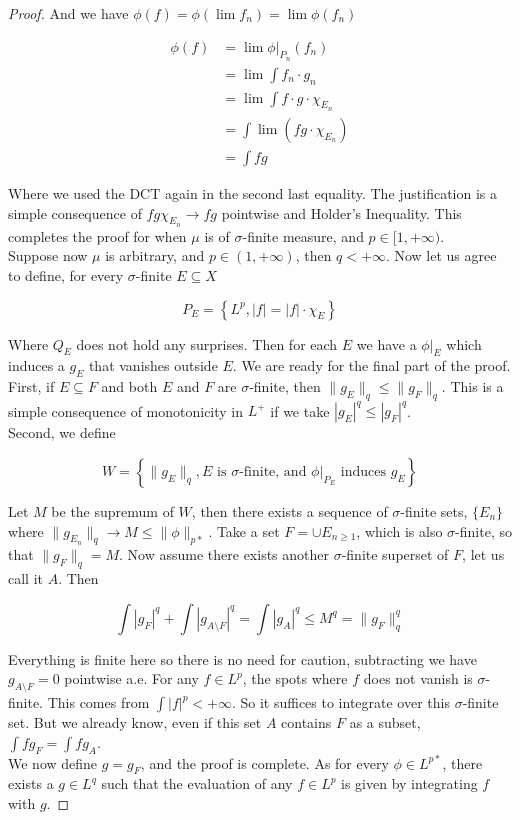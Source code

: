 \documentclass[../../main.tex]{subfiles}
\begin{document}
\begin{proof}
And we have $\phi(f) = \phi(\lim f_n) = \lim\phi(f_n)$

\begin{align*}
    \phi(f) &= \lim \phi|_{P_n}(f_n)\\
    &= \lim \int f_n\cdot g_n\\
    &= \lim \int f\cdot g\cdot\chi_{E_n}\\
    &= \int \lim\left(fg\cdot\chi_{E_n}\right)\\
    &= \int fg
\end{align*}

Where we used the DCT again in the second last equality. The justification is a simple consequence of $fg\chi_{E_n}\to fg$ pointwise and Holder's Inequality. This completes the proof for when $\mu$ is of $\sigma$-finite measure, and $p\in[1,+\infty)$.\\

Suppose now $\mu$ is arbitrary, and $p\in(1,+\infty)$, then $q<+\infty$. Now let us agree to define, for every $\sigma$-finite $E\subseteq X$

\[
P_E = \left\{L^p, |f| = |f|\cdot\chi_E\right\}
\]

Where $Q_E$ does not hold any surprises. Then for each $E$ we have a $\phi|_E$ which induces a $g_E$ that vanishes outside $E$. We are ready for the final part of the proof.\\

First, if $E\subseteq F$ and both $E$ and $F$ are $\sigma$-finite, then $\lVert g_E\rVert_q \leq \lVert g_F\rVert_q$. This is a simple consequence of monotonicity in $L^+$ if we take $|g_E|^q\leq |g_F|^q$.\\ 

Second, we define

\[
W = \left\{\lVert g_E\rVert_q, E \text{ is } \sigma \text{-finite, and }\phi|_{P_E} \text{ induces } g_E\right\}
\]

Let $M$ be the supremum of $W$, then there exists a sequence of $\sigma$-finite sets, $\{E_n\}$ where $\lVert g_{E_n}\rVert_q \to M\leq \lVert \phi \rVert_{p*}$. Take a set $F = \cup E_{n\geq 1}$, which is also $\sigma$-finite, so that $\lVert g_F \rVert_q = M$. Now assume there exists another $\sigma$-finite superset of $F$, let us call it $A$. Then 

\[
\int |g_F|^q + \int |g_{A\setminus F}|^q = \int |g_A|^q \leq M^q = \lVert g_F \rVert^q_q
\]

Everything is finite here so there is no need for caution, subtracting we have $g_{A\setminus F} = 0$ pointwise a.e. For any $f\in L^p$, the spots where $f$ does not vanish is $\sigma$-finite. This comes from $\int |f|^p < +\infty$. So it suffices to integrate over this $\sigma$-finite set. But we already know, even if this set $A$ contains $F$ as a subset,  $\int fg_{F} = \int fg_{A}$.\\

We now define $g = g_F$, and the proof is complete. As for every $\phi\in L^{p*}$, there exists a $g\in L^q$ such that the evaluation of any $f\in L^p$ is given by integrating $f$ with $g$.
\end{proof}
\end{document}
